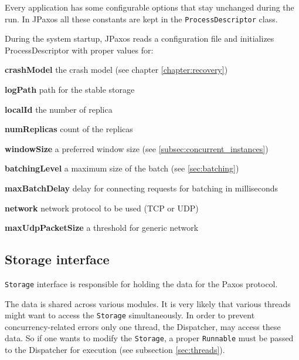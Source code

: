 Every application has some configurable options that stay unchanged during the run. In JPaxos all these constants are kept in the \texttt{ProcessDescriptor} class.

During the system startup, JPaxos reads a configuration file and initializes ProcessDescriptor with proper values for:
\begin{tightList}[\setlength{\labelwidth}{0em}]
 \item[\textbf{crashModel}] the crash model (see chapter \ref{chapter:recovery})
 \item[\textbf{logPath}] path for the stable storage
 \item[\textbf{localId}] the number of replica %
 \item[\textbf{numReplicas}] count of the replicas %
 \item[\textbf{windowSize}] a preferred window size (see \ref{subsec:concurrent_instances})
 \item[\textbf{batchingLevel}] a maximum size of the batch (see \ref{sec:batching})
 \item[\textbf{maxBatchDelay}] delay for connecting requests for batching in milliseconds
 \item[\textbf{network}] network protocol to be used (TCP or UDP)
 \item[\textbf{maxUdpPacketSize}] a threshold for generic network
\end{tightList}

\subsection{Storage interface}
\label{subsec:storage_interface}

\texttt{Storage} interface is responsible for holding the data for the Paxos protocol.

The data is shared across various modules.
It is very likely that various threads might want to access the \texttt{Storage} simultaneously. In order to prevent concurrency-related errors only one thread, the Dispatcher, may access these data. So if one wants to modify the \texttt{Storage}, a proper \texttt{Runnable} must be passed to the Dispatcher for execution (see subsection \ref{sec:threads}).

